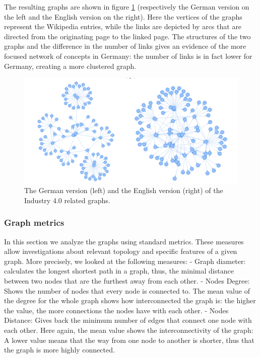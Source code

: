 \documentclass[]{book}
\begin{document}
The resulting graphs are shown in figure \ref{fig:graphindustrie1}
(respectively the German version on the left and the English version on
the right). Here the vertices of the graphs represent the Wikipedia
entries, while the links are depicted by arcs that are directed from the
originating page to the linked page. The structures of the two graphs
and the difference in the number of links gives an evidence of the more
focused network of concepts in Germany: the number of links is in fact
lower for Germany, creating a more clustered graph.

\begin{figure}

{\centering \includegraphics[width=1\linewidth]{_bookdown_files/figures/graph_1_industrie} 

}

\caption{The German version (left) and the English version (right) of the Industry 4.0 related graphs.}\label{fig:graphindustrie1}
\end{figure}

\subsubsection*{Graph metrics}\label{graph-metrics}

In this section we analyze the graphs using standard metrics. These
measures allow investigations about relevant topology and specific
features of a given graph. More precisely, we looked at the following
measures: - Graph diameter: calculates the longest shortest path in a
graph, thus, the minimal distance between two nodes that are the
furthest away from each other. - Nodes Degree: Shows the number of nodes
that every node is connected to. The mean value of the degree for the
whole graph shows how interconnected the graph is: the higher the value,
the more connections the nodes have with each other. - Nodes Distance:
Gives back the minimum number of edges that connect one node with each
other. Here again, the mean value shows the interconnectivity of the
graph: A lower value means that the way from one node to another is
shorter, thus that the graph is more highly connected.
\end{document}
